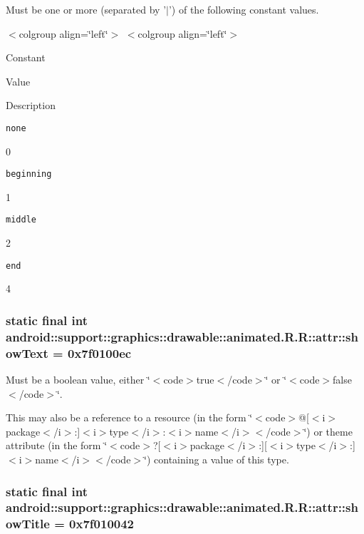 Must be one or more (separated by '$|$') of the following constant values. \begin{TabularC}{0}
\hline
\end{TabularC}
$<$colgroup align=\char`\"{}left\char`\"{}$>$ $<$colgroup align=\char`\"{}left\char`\"{}$>$ 

Constant

Value

Description 

{\tt none}

0

{\tt beginning}

1

{\tt middle}

2

{\tt end}

4\hypertarget{classandroid_1_1support_1_1graphics_1_1drawable_1_1animated_1_1_r_1_1attr_8b8509abbe0f05fa74aa99fde19dc4e8}{
\subsubsection[{showText}]{\setlength{\rightskip}{0pt plus 5cm}static final int android::support::graphics::drawable::animated.R.R::attr::showText = 0x7f0100ec}}
\label{classandroid_1_1support_1_1graphics_1_1drawable_1_1animated_1_1_r_1_1attr_8b8509abbe0f05fa74aa99fde19dc4e8}


Must be a boolean value, either \char`\"{}$<$code$>$true$<$/code$>$\char`\"{} or \char`\"{}$<$code$>$false$<$/code$>$\char`\"{}. 

This may also be a reference to a resource (in the form \char`\"{}$<$code$>$@\mbox{[}$<$i$>$package$<$/i$>$:\mbox{]}$<$i$>$type$<$/i$>$:$<$i$>$name$<$/i$>$$<$/code$>$\char`\"{}) or theme attribute (in the form \char`\"{}$<$code$>$?\mbox{[}$<$i$>$package$<$/i$>$:\mbox{]}\mbox{[}$<$i$>$type$<$/i$>$:\mbox{]}$<$i$>$name$<$/i$>$$<$/code$>$\char`\"{}) containing a value of this type. \hypertarget{classandroid_1_1support_1_1graphics_1_1drawable_1_1animated_1_1_r_1_1attr_1884c2797ff15ab217062a3e4397227e}{
\subsubsection[{showTitle}]{\setlength{\rightskip}{0pt plus 5cm}static final int android::support::graphics::drawable::animated.R.R::attr::showTitle = 0x7f010042}}
\label{classandroid_1_1support_1_1graphics_1_1drawable_1_1animated_1_1_r_1_1attr_1884c2797ff15ab217062a3e4397227e}


